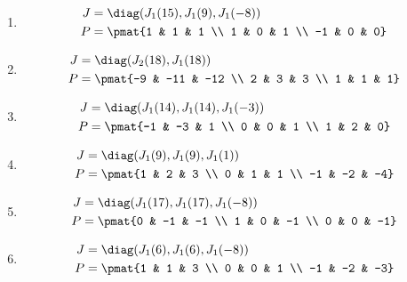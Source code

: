 \begin{enumerate}
\item

\begin{align*}
J &= \diag(J_{1}(15), J_{1}(9), J_{1}(-8))\\
P &= \pmat{1 & 1 & 1 \\ 1 & 0 & 1 \\ -1 & 0 & 0}
\end{align*}

\item

\begin{align*}
J &= \diag(J_{2}(18), J_{1}(18))\\
P &= \pmat{-9 & -11 & -12 \\ 2 & 3 & 3 \\ 1 & 1 & 1}
\end{align*}

\item

\begin{align*}
J &= \diag(J_{1}(14), J_{1}(14), J_{1}(-3))\\
P &= \pmat{-1 & -3 & 1 \\ 0 & 0 & 1 \\ 1 & 2 & 0}
\end{align*}

\item

\begin{align*}
J &= \diag(J_{1}(9), J_{1}(9), J_{1}(1))\\
P &= \pmat{1 & 2 & 3 \\ 0 & 1 & 1 \\ -1 & -2 & -4}
\end{align*}

\item

\begin{align*}
J &= \diag(J_{1}(17), J_{1}(17), J_{1}(-8))\\
P &= \pmat{0 & -1 & -1 \\ 1 & 0 & -1 \\ 0 & 0 & -1}
\end{align*}

\item

\begin{align*}
J &= \diag(J_{1}(6), J_{1}(6), J_{1}(-8))\\
P &= \pmat{1 & 1 & 3 \\ 0 & 0 & 1 \\ -1 & -2 & -3}
\end{align*}


\end{enumerate}
